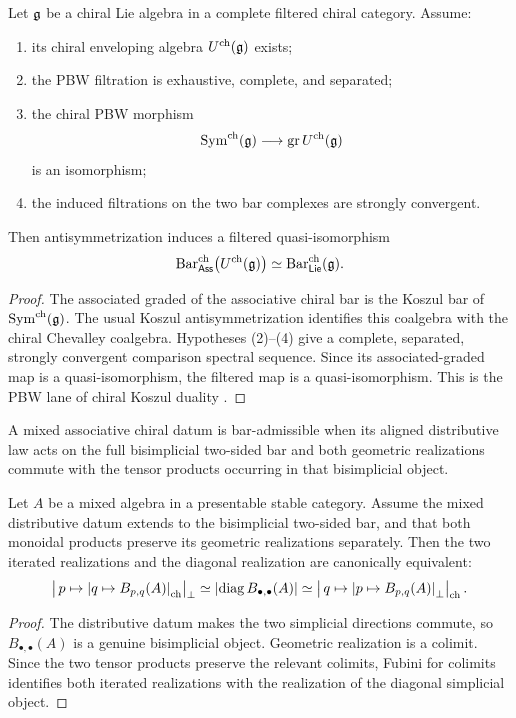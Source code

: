 \begin{theorem}
Let $\mathfrak g$ be a chiral Lie algebra in a complete filtered chiral category.  Assume:
\begin{enumerate}
\item its chiral enveloping algebra $U^{\mathrm{ch}}(\mathfrak g)$ exists;
\item the PBW filtration is exhaustive, complete, and separated;
\item the chiral PBW morphism
\[
 \operatorname{Sym}^{\mathrm{ch}}(\mathfrak g)\longrightarrow \operatorname{gr} U^{\mathrm{ch}}(\mathfrak g)
\]
is an isomorphism;
\item the induced filtrations on the two bar complexes are strongly convergent.
\end{enumerate}
Then antisymmetrization induces a filtered quasi-isomorphism
\[
 \operatorname{Bar}^{\mathrm{ch}}_{\mathsf{Ass}}\bigl(U^{\mathrm{ch}}(\mathfrak g)\bigr)
 \simeq
 \operatorname{Bar}^{\mathrm{ch}}_{\mathsf{Lie}}(\mathfrak g).
\]
\end{theorem}
\begin{proof}
The associated graded of the associative chiral bar is the Koszul bar of $\operatorname{Sym}^{\mathrm{ch}}(\mathfrak g)$.  The usual Koszul antisymmetrization identifies this coalgebra with the chiral Chevalley coalgebra.  Hypotheses (2)--(4) give a complete, separated, strongly convergent comparison spectral sequence.  Since its associated-graded map is a quasi-isomorphism, the filtered map is a quasi-isomorphism.  This is the PBW lane of chiral Koszul duality \cite{BD04,FG12}.
\end{proof}

\begin{definition}
A mixed associative chiral datum is bar-admissible when its aligned distributive law acts on the full bisimplicial two-sided bar and both geometric realizations commute with the tensor products occurring in that bisimplicial object.
\end{definition}

\begin{theorem}
Let $A$ be a mixed algebra in a presentable stable category.  Assume the mixed distributive datum extends to the bisimplicial two-sided bar, and that both monoidal products preserve its geometric realizations separately.  Then the two iterated realizations and the diagonal realization are canonically equivalent:
\[
 \left|\,p\mapsto\left|q\mapsto B_{p,q}(A)\right|_{\mathrm{ch}}\right|_\perp
 \simeq
 \left|\operatorname{diag}B_{\bullet,\bullet}(A)\right|
 \simeq
 \left|\,q\mapsto\left|p\mapsto B_{p,q}(A)\right|_\perp\right|_{\mathrm{ch}}.
\]
\end{theorem}
\begin{proof}
The distributive datum makes the two simplicial directions commute, so $B_{\bullet,\bullet}(A)$ is a genuine bisimplicial object.  Geometric realization is a colimit.  Since the two tensor products preserve the relevant colimits, Fubini for colimits identifies both iterated realizations with the realization of the diagonal simplicial object.
\end{proof}

